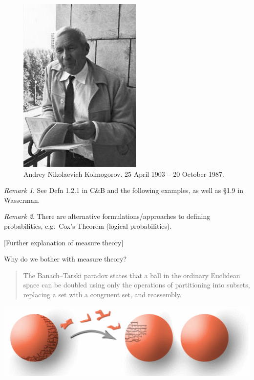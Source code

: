 \documentclass[
]{book}
\theoremstyle{definition}
\theoremstyle{definition}
\theoremstyle{definition}
\theoremstyle{definition}
\theoremstyle{remark}
\newtheorem*{remark}{Remark}
\begin{document}
\begin{figure}
\centering
\includegraphics{figure/kolmogorov.jpg}
\caption{Andrey Nikolaevich Kolmogorov. 25 April 1903 -- 20 October 1987.}
\end{figure}

\begin{remark}
See Defn 1.2.1 in C\&B and the following examples, as well as §1.9 in Wasserman.
\end{remark}

\begin{remark}
There are alternative formulations/approaches to defining probabilities, e.g.~Cox's Theorem (logical probabilities).
\end{remark}

{[}Further explanation of measure theory{]}

Why do we bother with measure theory?

\begin{quote}
The Banach--Tarski paradox states that a ball in the ordinary Euclidean space can be doubled using only the operations of partitioning into subsets, replacing a set with a congruent set, and reassembly.
\end{quote}

\includegraphics{figure/banach_tarski.png}
\end{document}
